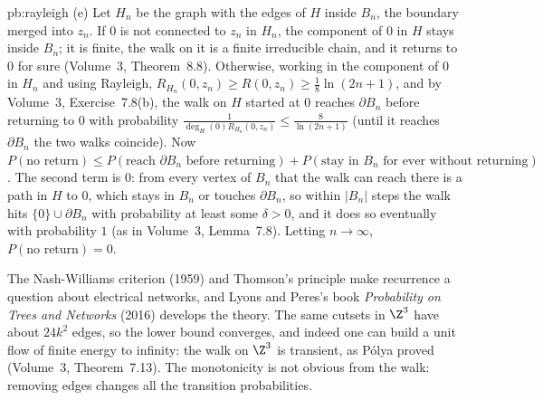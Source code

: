 \begin{solution}{pb:rayleigh}
(e) Let $H_n$ be the graph with the edges of $H$ inside $B_n$, the boundary merged into $z_n$. If $0$ is not connected to $z_n$ in $H_n$, the component of $0$ in $H$
stays inside $B_n$; it is finite, the walk on it is a finite irreducible chain, and it returns to $0$ for sure (Volume~3, Theorem~8.8). Otherwise, working in
the component of $0$ in $H_n$ and using Rayleigh, $R_{H_n}(0,z_n)\ge R(0,z_n)\ge\frac18\ln(2n+1)$, and by Volume~3, Exercise~7.8(b), the walk on $H$
started at $0$ reaches $\partial B_n$ before returning to $0$ with probability $\frac1{\deg_H(0)R_{H_n}(0,z_n)}\le\frac8{\ln(2n+1)}$ (until it reaches $\partial B_n$ the two walks coincide). Now
$P(\text{no return})\le P(\text{reach }\partial B_n\text{ before returning})+P(\text{stay in }B_n\text{ for ever without returning})$. The second term is $0$: from every vertex of $B_n$ that the walk
can reach there is a path in $H$ to $0$, which stays in $B_n$ or touches $\partial B_n$, so within $|B_n|$ steps the walk hits $\{0\}\cup\partial B_n$ with probability at least some
$\delta>0$, and it does so eventually with probability $1$ (as in Volume~3, Lemma~7.8). Letting $n\to\infty$, $P(\text{no return})=0$.

\leads The Nash-Williams criterion (1959) and Thomson's principle make recurrence a question about electrical networks, and Lyons and
Peres's book \emph{Probability on Trees and Networks} (2016) develops the theory. The same cutsets in $\Z^3$ have about $24k^2$ edges, so the
lower bound converges, and indeed one can build a unit flow of finite energy to infinity: the walk on $\Z^3$ is transient, as Pólya
proved (Volume~3, Theorem~7.13). The monotonicity is not obvious from the walk: removing edges changes all the transition probabilities.
\end{solution}

